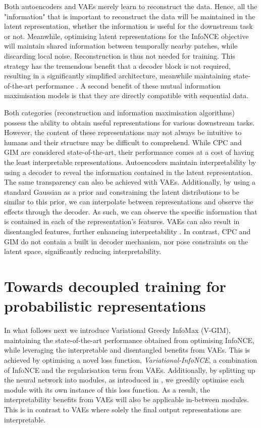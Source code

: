 		Both autoencoders and VAEs merely learn to reconstruct the data. Hence, all the "information" that is important to reconstruct the data will be maintained in the latent representation, whether the information is useful for the downstream task or not. Meanwhile, optimising latent representations for the InfoNCE objective will maintain shared information between temporally nearby patches, while discarding local noise. Reconstruction is thus not needed for training. This strategy has the tremendous benefit that a decoder block is not required, resulting in a significantly simplified architecture, meanwhile maintaining state-of-the-art performance \cite{stackeEvaluationContrastivePredictive2020}. A second benefit of these mutual information maximisation models is that they are directly compatible with sequential data.
		
		Both categories (reconstruction and information maximisation algorithms) possess the ability to obtain useful representations for various downstream tasks. However, the content of these representations may not always be intuitive to humans and their structure may be difficult to comprehend. While CPC and GIM are considered state-of-the-art, their performance comes at a cost of having the least interpretable representations. Autoencoders maintain interpretability by using a decoder to reveal the information contained in the latent representation. The same transparency can also be achieved with VAEs. Additionally, by using a standard Gaussian as a prior and constraining the latent distributions to be similar to this prior, we can interpolate between representations and observe the effects through the decoder. As such, we can observe the specific information that is contained in each of the representation's features. VAEs can also result in disentangled features, further enhancing interpretability \cite{grossuttiDeepLearningInfrared2022}. In contrast, CPC and GIM do not contain a built in decoder mechanism, nor pose constraints on the latent space, significantly reducing interpretability.
		


\section{Towards decoupled training for probabilistic representations}
		In what follows next we introduce Variational Greedy InfoMax (V-GIM), maintaining the state-of-the-art performance obtained from optimising InfoNCE, while leveraging the interpretable and disentangled benefits from VAEs. This is achieved by optimising a novel loss function, \textit{Variational-InfoNCE}, a combination of InfoNCE and the regularisation term from VAEs. Additionally, by splitting up the neural network into modules, as introduced in \cite{lowePuttingEndEndtoEnd2020}, we greedily optimise each module with its own instance of this loss function. As a result, the interpretability benefits from VAEs will also be applicable in-between modules. This is in contrast to VAEs where solely the final output representations are interpretable.		
				
